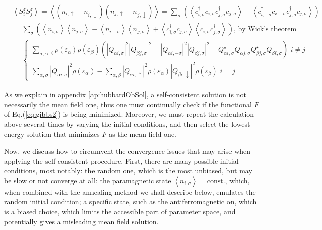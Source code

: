 \begin{equation}
\begin{split}
&\left\langle S_i^z S_j^z \right\rangle = \left\langle ( n_{i,\uparrow} -  n_{i,\downarrow} ) ( n_{j,\uparrow} -  n_{j,\downarrow} )  \right\rangle = \sum_{\sigma} \left( \left\langle c_{i,\sigma}^\dagger c_{i,\sigma} c_{j,\sigma}^\dagger c_{j,\sigma} \right\rangle - \left\langle c_{i,-\sigma}^\dagger c_{i,-\sigma} c_{j,\sigma}^\dagger c_{j,\sigma} \right\rangle \right) \\
&=\sum_{\sigma} \left( \left\langle n_{i,\sigma} \right\rangle \left\langle n_{j,\sigma} \right\rangle - \left\langle n_{i,-\sigma} \right\rangle \left\langle n_{j,\sigma} \right\rangle + \left\langle c_{i,\sigma}^\dagger c_{j,\sigma}  \right\rangle \left\langle c_{i,\sigma} c_{j,\sigma}^\dagger \right\rangle \right) , \, \text{by Wick's theorem} \\
&=
\begin{cases}
\sum_{\sigma, \alpha, \beta} \rho ( \varepsilon_\alpha ) \rho ( \varepsilon_\beta ) \left( | Q_{\alpha i, \sigma} |^2 | Q_{\beta j, \sigma} |^2  - | Q_{\alpha i, -\sigma} |^2 | Q_{\beta j, \sigma} |^2  - Q_{\alpha i, \sigma}^\star Q_{\alpha j, 
\sigma}  Q_{\beta j, \sigma}^\star Q_{\beta i, 
\sigma} \right) \,\, i \neq j \\
\sum_{\alpha,\sigma} | Q_{\alpha i, \sigma} |^2 \rho (\varepsilon_\alpha) - \sum_{\alpha,\beta} | Q_{\alpha i, \uparrow} |^2 \rho (\varepsilon_\alpha) | Q_{\beta i, \downarrow} |^2 \rho (\varepsilon_\beta) \,\, i = j
\end{cases}
\end{split}
\end{equation}

As we explain in appendix \ref{ap:hubbardObSol}, a self-consistent solution is not necessarily the mean field one, thus one must continually check if the functional $F$ of Eq.(\ref{eq:gibbs2}) is being minimized.
Moreover, we must repeat the calculation above several times by varying the initial conditions, and then select the lowest energy solution that minimizes $F$ as the mean field one.

Now, we discuss how to circumvent the convergence issues that may arise when applying the self-consistent procedure.
First, there are many possible initial conditions, most notably: the random one, which is the most unbiased, but may be slow or not converge at all; the paramagnetic state $\left\langle n_{i,\sigma} \right\rangle = \text{const.}$, which, when combined with the annealing method we shall describe below, emulates the random initial condition; a specific state, such as the antiferromagnetic on, which is a biased choice, which limits the accessible part of parameter space, and potentially gives a misleading mean field solution.

